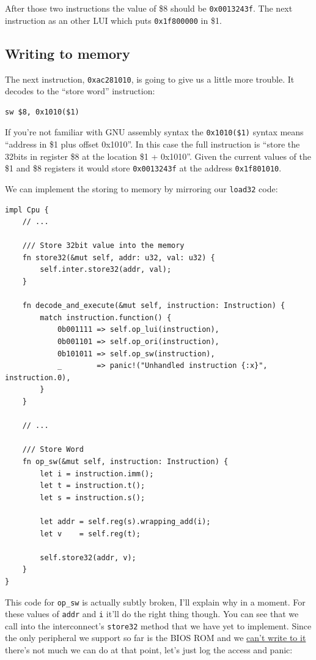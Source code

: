 \documentclass[a4paper]{article}
\newcommand{\code}[1] {\texttt{#1}}
\begin{document}
After those two instructions the value of \$8 should be
\code{0x0013243f}. The next instruction as an other LUI which puts
\code{0x1f800000} in \$1.

\subsection{Writing to memory}

The next instruction, \code{0xac281010}, is going to give us a
little more trouble. It decodes to the ``store word'' instruction:

\begin{lstlisting}[language=assembly]
sw $8, 0x1010($1)
\end{lstlisting}

If you're not familiar with GNU assembly syntax the
\code{0x1010(\$1)} syntax means ``address in \$1 plus offset
0x1010''. In this case the full instruction is ``store the 32bits in
register \$8 at the location \$1 + 0x1010''. Given the current values
of the \$1 and \$8 registers it would store \code{0x0013243f} at the
address \code{0x1f801010}.

We can implement the storing to memory by mirroring our
\code{load32} code:

\begin{lstlisting}
impl Cpu {
    // ...

    /// Store 32bit value into the memory
    fn store32(&mut self, addr: u32, val: u32) {
        self.inter.store32(addr, val);
    }

    fn decode_and_execute(&mut self, instruction: Instruction) {
        match instruction.function() {
            0b001111 => self.op_lui(instruction),
            0b001101 => self.op_ori(instruction),
            0b101011 => self.op_sw(instruction),
            _        => panic!("Unhandled instruction {:x}", instruction.0),
        }
    }

    // ...

    /// Store Word
    fn op_sw(&mut self, instruction: Instruction) {
        let i = instruction.imm();
        let t = instruction.t();
        let s = instruction.s();

        let addr = self.reg(s).wrapping_add(i);
        let v    = self.reg(t);

        self.store32(addr, v);
    }
}
\end{lstlisting}

This code for \code{op\_sw} is actually subtly broken, I'll explain
why in a moment. For these values of \code{addr} and \code{i}
it'll do the right thing though. You can see that we call into the
interconnect's \code{store32} method that we have yet to
implement. Since the only peripheral we support so far is the BIOS ROM
and we
\href{https://github.com/simias/psx-hardware-tests/blob/master/tests/bios_write/main.s}{can't
  write to it} there's not much we can do at that point, let's just
log the access and panic:
\end{document}
